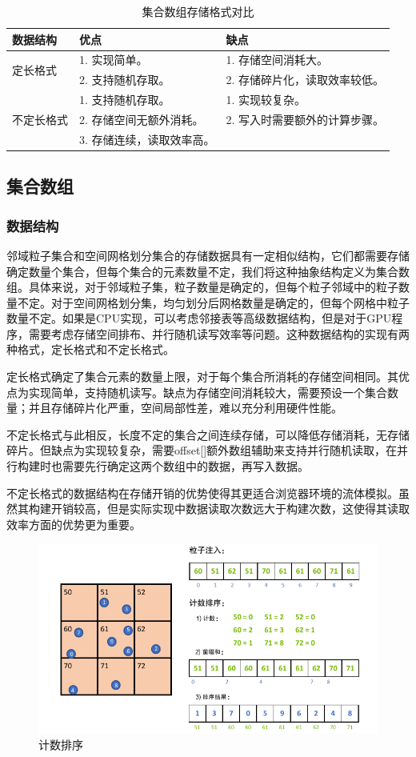     \begin{table}
	\centering
	\caption{集合数组存储格式对比}
	\begin{tabular}{lll}
	\toprule
	数据结构 & 优点 & 缺点 \\
	\midrule
	\multirow{2}{*}{定长格式}
	& 1. 实现简单。  & 1. 存储空间消耗大。  \\
	& 2. 支持随机存取。  & 2. 存储碎片化，读取效率较低。  \\
	\hline
	\multirow{3}{*}{不定长格式} 
	& 1. 支持随机存取。  & 1. 实现较复杂。 \\
	& 2. 存储空间无额外消耗。  & 2. 写入时需要额外的计算步骤。  \\
	& 3. 存储连续，读取效率高。  &   \\
	\bottomrule
	\end{tabular}
\end{table}

\subsection{集合数组}
\subsubsection{数据结构}
    邻域粒子集合和空间网格划分集合的存储数据具有一定相似结构，它们都需要存储确定数量个集合，但每个集合的元素数量不定，我们将这种抽象结构定义为集合数组。具体来说，对于邻域粒子集，粒子数量是确定的，但每个粒子邻域中的粒子数量不定。对于空间网格划分集，均匀划分后网格数量是确定的，但每个网格中粒子数量不定。如果是CPU实现，可以考虑邻接表等高级数据结构，但是对于GPU程序，需要考虑存储空间排布、并行随机读写效率等问题。这种数据结构的实现有两种格式，定长格式和不定长格式。
    
    定长格式确定了集合元素的数量上限，对于每个集合所消耗的存储空间相同。其优点为实现简单，支持随机读写。缺点为存储空间消耗较大，需要预设一个集合数量；并且存储碎片化严重，空间局部性差，难以充分利用硬件性能。
    
    不定长格式与此相反，长度不定的集合之间连续存储，可以降低存储消耗，无存储碎片。但缺点为实现较复杂，需要offset[]额外数组辅助来支持并行随机读取，在并行构建时也需要先行确定这两个数组中的数据，再写入数据。
    
    不定长格式的数据结构在存储开销的优势使得其更适合浏览器环境的流体模拟。虽然其构建开销较高，但是实际实现中数据读取次数远大于构建次数，这使得其读取效率方面的优势更为重要。

    \begin{figure}[htbp]
    	\centering
    	\includegraphics[width=.8\textwidth]{figures/neighbor/counting_sort.pdf}
    	\caption{计数排序}
    \end{figure}

